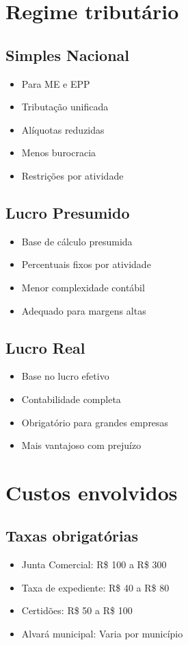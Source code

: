 \documentclass[12pt,a4paper]{article}
\begin{document}
\section{Regime tributário}

\subsection{Simples Nacional}
\begin{itemize}
    \item Para ME e EPP
    \item Tributação unificada
    \item Alíquotas reduzidas
    \item Menos burocracia
    \item Restrições por atividade
\end{itemize}

\subsection{Lucro Presumido}
\begin{itemize}
    \item Base de cálculo presumida
    \item Percentuais fixos por atividade
    \item Menor complexidade contábil
    \item Adequado para margens altas
\end{itemize}

\subsection{Lucro Real}
\begin{itemize}
    \item Base no lucro efetivo
    \item Contabilidade completa
    \item Obrigatório para grandes empresas
    \item Mais vantajoso com prejuízo
\end{itemize}

\section{Custos envolvidos}

\subsection{Taxas obrigatórias}
\begin{itemize}
    \item Junta Comercial: R\$ 100 a R\$ 300
    \item Taxa de expediente: R\$ 40 a R\$ 80
    \item Certidões: R\$ 50 a R\$ 100
    \item Alvará municipal: Varia por município
\end{itemize}
\end{document}
